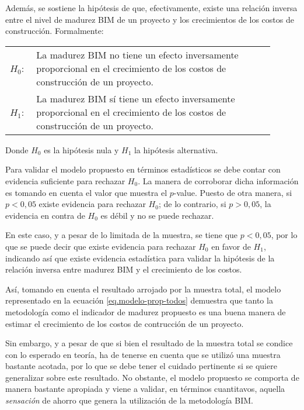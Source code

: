 Además, se sostiene la hipótesis de que, efectivamente, existe una relación inversa entre el nivel de madurez BIM de un proyecto y los crecimientos de los costos de construcción. Formalmente:

\begin{table}[H]
    \begin{tabular}{l p{0.9\linewidth}}
        $H_0$: & La madurez BIM no tiene un efecto inversamente proporcional en el crecimiento de los costos de construcción de un proyecto. \\

        $H_1$: & La madurez BIM sí tiene un efecto inversamente proporcional en el crecimiento de los costos de construcción de un proyecto.
    \end{tabular}
\end{table}

Donde $H_0$ es la hipótesis nula y $H_1$ la hipótesis alternativa. 

Para validar el modelo propuesto en términos estadísticos se debe contar con evidencia suficiente para rechazar $H_0$. La manera de corroborar dicha información es tomando en cuenta el valor que muestra el $p$-value. Puesto de otra manera, si $p<0,05$ existe evidencia para rechazar $H_0$; de lo contrario, si $p>0,05$, la evidencia en contra de $H_0$ es débil y no se puede rechazar. 

En este caso, y a pesar de lo limitada de la muestra, se tiene que $p<0,05$, por lo que se puede decir que existe evidencia para rechazar $H_0$ en favor de $H_1$, indicando así que existe evidencia estadística para validar la hipótesis de la relación inversa entre madurez BIM y el crecimiento de los costos.

Así, tomando en cuenta el resultado arrojado por la muestra total, el modelo representado en la ecuación \eqref{eq.modelo-prop-todos} demuestra que tanto la metodología como el indicador de madurez propuesto es una buena manera de estimar el crecimiento de los costos de contrucción de un proyecto. 

Sin embargo, y a pesar de que si bien el resultado de la muestra total se condice con lo esperado en teoría, ha de tenerse en cuenta que se utilizó una muestra bastante acotada, por lo que se debe tener el cuidado pertinente si se quiere generalizar sobre este resultado. No obstante, el modelo propuesto se comporta de manera bastante apropiada y viene a validar, en términos cuantitavos, aquella \emph{sensación} de ahorro que genera la utilización de la metodología BIM.